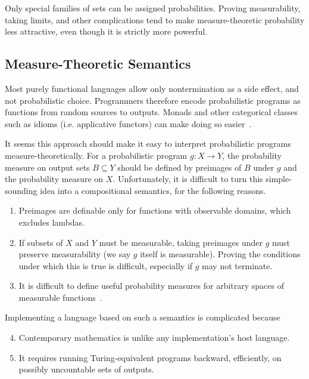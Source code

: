 Only special families of  sets can be assigned probabilities.
Proving measurability, taking limits, and other complications tend to make measure-theoretic probability less attractive, even though it is strictly more powerful.

\subsection{Measure-Theoretic Semantics}

Most purely functional languages allow only nontermination as a side effect, and not probabilistic choice.
Programmers therefore encode probabilistic programs as functions from random sources to outputs.
Monads and other categorical classes such as idioms (i.e. applicative functors) can make doing so easier~\cite{cit:hurd-2002thesis,cit:toronto-2010ifl-bayes}.

It seems this approach should make it easy to interpret probabilistic programs measure-theoretically.
For a probabilistic program $g : X \to Y$, the probability measure on output sets $B \subseteq Y$ should be defined by preimages of $B$ under $g$ and the probability measure on $X$.
Unfortunately, it is difficult to turn this simple-sounding idea into a compositional semantics, for the following reasons.
\begin{enumerate}
	\item Preimages are definable only for functions with observable domains, which excludes lambdas.%
\label{problem:observable-domain}
	\item If subsets of $X$ and $Y$ must be measurable, taking preimages under $g$ must preserve measurability (we say $g$ itself is measurable). Proving the conditions under which this is true is difficult, especially if $g$ may not terminate.%
\label{problem:measurability}
	\item It is difficult to define useful probability measures for arbitrary spaces of measurable functions~\cite{cit:aumann-1961ijm-borel}.%
\label{problem:higher-orderness}
\end{enumerate}
Implementing a language based on such a semantics is complicated because
\begin{enumerate}
	\setcounter{enumi}{3}
	\item Contemporary mathematics is unlike any implementation's host language.%
\label{problem:different-language}
	\item It requires running Turing-equivalent programs backward, efficiently, on possibly uncountable sets of outputs.%
\label{problem:backward-efficient}
\end{enumerate}

